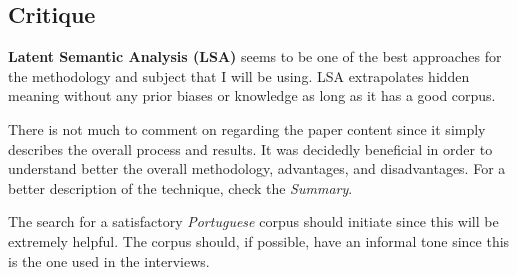 \documentclass{Paper_Summary}
\begin{document}
\makepapertitle

\breakline

\begin{center}
    \section*{Critique}
\end{center}
    
    \textbf{Latent Semantic Analysis (LSA)} seems to be one of the best approaches for the methodology and subject that I will be using. LSA extrapolates hidden meaning without any prior biases or knowledge as long as it has a good corpus.
 
    There is not much to comment on regarding the paper content since it simply describes the overall process and results. It was decidedly beneficial in order to understand better the overall methodology, advantages, and disadvantages. For a better description of the technique, check the \emph{Summary}.

    The search for a satisfactory \emph{Portuguese} corpus should initiate since this will be extremely helpful. The corpus should, if possible, have an informal tone since this is the one used in the interviews.

\breakline
\end{document}
